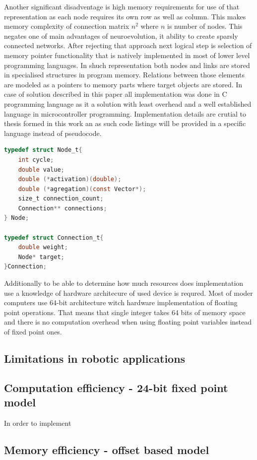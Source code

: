 Another significant disadventage is high memory requirements for use of that representation as 
each node requires its own row as well as column. This makes memory complexity of connection 
matrix $n^2$ where $n$ is number of nodes.
This negates one of main advantages of neuroevolution, it ability to create sparsly connected 
networks.
After rejecting that approach next logical step is selection of memory pointer functionality
that is natively implemented in most of lower level programming languages.
In shuch representation both nodes and links are stored in specialised structures in program
memory. Relations between those elements are modeled as a pointers to memory parts where target
objects are stored.
In case of solution described in this paper all implementation was done in C programming language
as it a solution with least overhead and a well established language in microcontroller
programming. 
Implementation details are crutial to thesis formed in this work an as such code listings will be
provided in a specific language instead of pseudocode.
\begin{lstlisting}[frame=single, language=C, caption={Implementation of Node and Link structures in C}]
typedef struct Node_t{
	int cycle;
	double value;
	double (*activation)(double);
	double (*agregation)(const Vector*);
	size_t connection_count;
	Connection** connections;
} Node;

typedef struct Connection_t{
	double weight;
	Node* target;
}Connection;
\end{lstlisting}
Additionally to be able to determine how much resources does implementation use a knowledge of 
hardware architecure of used device is requred.
Most of moder computers use 64-bit architecture witch hardware implementation of floating point
operations. That means that single integer takes 64 bits of memory space and there is no 
computation overhead when using floating point variables instead of fixed point ones.

\FloatBarrier
\subsection{Limitations in robotic applications}

\FloatBarrier
\subsection{Computation efficiency - 24-bit fixed point model}
\label{sec:fixed-model}
In order to implement 

\FloatBarrier
\subsection{Memory efficiency - offset based model}
